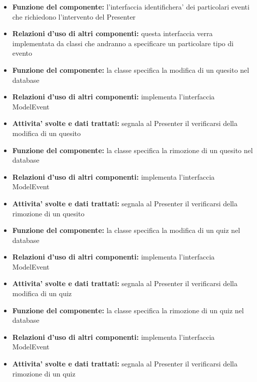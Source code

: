\documentclass[a4paper,11pt]{article}
\begin{document}
			\begin{itemize}
		    	\item\textbf{Funzione del componente:} l'interfaccia identifichera' dei particolari eventi che richiedono l'intervento del Presenter
			\item\textbf{Relazioni d'uso di altri componenti:} questa interfaccia verra implementata da classi che andranno a specificare un particolare tipo di evento
			\end{itemize}
			\begin{itemize}
		    	\item\textbf{Funzione del componente:} la classe specifica la modifica di un quesito nel database
				\item\textbf{Relazioni d'uso di altri componenti:} implementa l'interfaccia ModelEvent
				\item\textbf{Attivita' svolte e dati trattati:} segnala al Presenter il verificarsi della modifica di un quesito
			\end{itemize}
			\begin{itemize}
		    	\item\textbf{Funzione del componente:} la classe specifica la rimozione di un quesito nel database
				\item\textbf{Relazioni d'uso di altri componenti:} implementa l'interfaccia ModelEvent
				\item\textbf{Attivita' svolte e dati trattati:} segnala al Presenter il verificarsi della rimozione di un quesito
			\end{itemize}
			\begin{itemize}
		    	\item\textbf{Funzione del componente:} la classe specifica la modifica di un quiz nel database
				\item\textbf{Relazioni d'uso di altri componenti:} implementa l'interfaccia ModelEvent
				\item\textbf{Attivita' svolte e dati trattati:} segnala al Presenter il verificarsi della modifica di un quiz
			\end{itemize}
			\begin{itemize}
		    	\item\textbf{Funzione del componente:} la classe specifica la rimozione di un quiz nel database
				\item\textbf{Relazioni d'uso di altri componenti:} implementa l'interfaccia ModelEvent
				\item\textbf{Attivita' svolte e dati trattati:} segnala al Presenter il verificarsi della rimozione di un quiz
			\end{itemize}
\end{document}
